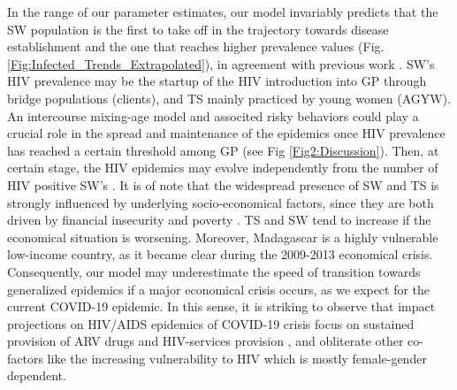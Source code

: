 \documentclass[preprint,12pt]{elsarticle}
\begin{document}
In the range of our parameter estimates, our model invariably predicts that the SW population is the first to take off in the trajectory towards disease establishment and the one that reaches higher prevalence values (Fig. \ref{Fig:Infected_Trends_Extrapolated}), in agreement with previous work \cite{Bershteyn2013}. SW’s HIV prevalence may be the startup of the HIV introduction into GP through bridge populations (clients), and TS mainly practiced by young women (AGYW). An intercourse mixing-age model and associted risky behaviors could play a crucial role in the spread and maintenance of the epidemics once HIV prevalence has reached a certain threshold among GP (see Fig \ref{Fig2:Discussion}). Then, at certain stage, the HIV epidemics may evolve independently from the number of HIV positive SW's \cite{Bershteyn2013}. It is of note that the widespread presence of SW and TS is strongly influenced by underlying socio-economical factors, since they are both driven by financial insecurity and poverty \cite{Ingabire2012,Fitzgerald-Husek2011}. TS and SW tend to increase if the economical situation is worsening. Moreover, Madagascar is a highly vulnerable low-income country, as it became clear during the 2009-2013 economical crisis. Consequently, our model may underestimate the speed of transition towards generalized epidemics if a major economical crisis occurs, as we expect for the current COVID-19 epidemic. In this sense, it is striking to observe that impact projections on HIV/AIDS epidemics of COVID-19 crisis focus on sustained provision of ARV drugs and HIV-services provision \cite{Jewell2020}, and obliterate other co-factors like the increasing vulnerability to HIV which is mostly female-gender dependent.
\smallskip

\smallskip
\end{document}

